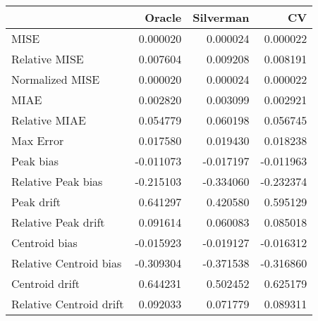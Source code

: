 \begin{tabular}{lrrr}
  \hline
 & Oracle & Silverman & CV \\ 
  \hline
MISE & 0.000020 & 0.000024 & 0.000022 \\ 
  Relative MISE & 0.007604 & 0.009208 & 0.008191 \\ 
  Normalized MISE & 0.000020 & 0.000024 & 0.000022 \\ 
  MIAE & 0.002820 & 0.003099 & 0.002921 \\ 
  Relative MIAE & 0.054779 & 0.060198 & 0.056745 \\ 
  Max Error & 0.017580 & 0.019430 & 0.018238 \\ 
  Peak bias & -0.011073 & -0.017197 & -0.011963 \\ 
  Relative Peak bias & -0.215103 & -0.334060 & -0.232374 \\ 
  Peak drift & 0.641297 & 0.420580 & 0.595129 \\ 
  Relative Peak drift & 0.091614 & 0.060083 & 0.085018 \\ 
  Centroid bias & -0.015923 & -0.019127 & -0.016312 \\ 
  Relative Centroid bias & -0.309304 & -0.371538 & -0.316860 \\ 
  Centroid drift & 0.644231 & 0.502452 & 0.625179 \\ 
  Relative Centroid drift & 0.092033 & 0.071779 & 0.089311 \\ 
   \hline
\end{tabular}
